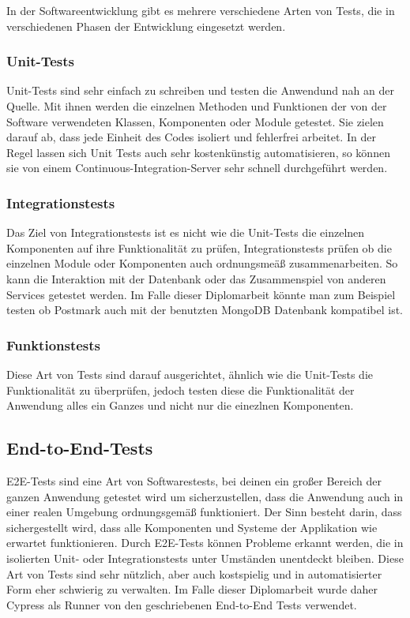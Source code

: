 In der Softwareentwicklung gibt es mehrere verschiedene Arten von Tests, die in verschiedenen Phasen der Entwicklung eingesetzt werden.

\subsubsection{Unit-Tests}
Unit-Tests sind sehr einfach zu schreiben und testen die Anwendund nah an der Quelle. Mit ihnen werden die einzelnen Methoden und Funktionen der von der Software verwendeten Klassen, Komponenten oder Module getestet. Sie zielen darauf ab, dass jede Einheit des Codes isoliert und fehlerfrei arbeitet. In der Regel lassen sich Unit Tests auch sehr kostenkünstig automatisieren, so können sie von einem Continuous-Integration-Server sehr schnell durchgeführt werden.


\subsubsection{Integrationstests}
Das Ziel von Integrationstests ist es nicht wie die Unit-Tests die einzelnen Komponenten auf ihre Funktionalität zu prüfen, Integrationstests prüfen ob die einzelnen Module oder Komponenten auch ordnungsmeäß zusammenarbeiten. So kann die Interaktion mit der Datenbank oder das Zusammenspiel von anderen Services getestet werden. Im Falle dieser Diplomarbeit könnte man zum Beispiel testen ob Postmark auch mit der benutzten MongoDB Datenbank kompatibel ist.

\subsubsection{Funktionstests}
Diese Art von Tests sind darauf ausgerichtet, ähnlich wie die Unit-Tests die Funktionalität zu überprüfen, jedoch testen diese die Funktionalität der Anwendung alles ein Ganzes und nicht nur die einezlnen Komponenten.

\subsection{End-to-End-Tests}
E2E-Tests sind eine Art von Softwarestests, bei deinen ein großer Bereich der ganzen Anwendung getestet wird um sicherzustellen, dass die Anwendung auch in einer realen Umgebung ordnungsgemäß funktioniert. Der Sinn besteht darin, dass sichergestellt wird, dass alle Komponenten und Systeme der Applikation wie erwartet funktionieren. Durch E2E-Tests können Probleme erkannt werden, die in isolierten Unit- oder Integrationstests unter Umständen unentdeckt bleiben. Diese Art von Tests sind sehr nützlich, aber auch kostspielig und in automatisierter Form eher schwierig zu verwalten. Im Falle dieser Diplomarbeit wurde daher Cypress als Runner von den geschriebenen End-to-End Tests verwendet.


\cite{Verschiedene_Testarten}
